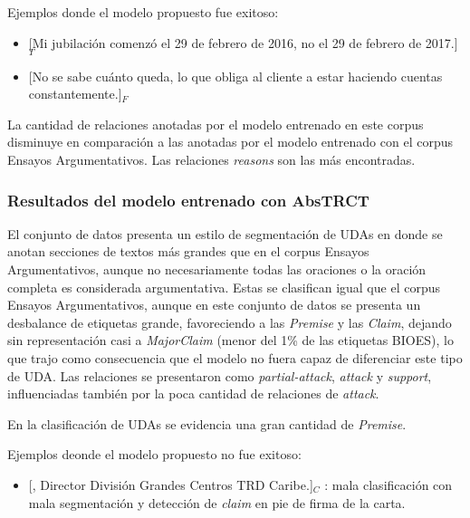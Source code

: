 \documentclass{rcci} %
\begin{document}
Ejemplos donde el modelo propuesto fue exitoso:
\begin{itemize}
	\item \text{} [Mi jubilaci\'on comenz\'o el 29 de febrero de 2016, no el 29 de febrero de 2017.]$_T$ %
	\item \text{} [No se sabe cu\'anto queda, lo que obliga al cliente a estar haciendo cuentas constantemente.]$_F$ %
\end{itemize}

La cantidad de relaciones anotadas por el modelo entrenado en este corpus
disminuye en comparaci\'on a las anotadas por el modelo entrenado con el corpus Ensayos
Argumentativos. Las relaciones \textit{reasons} son las m\'as encontradas. %

\subsubsection*{Resultados del modelo entrenado con AbsTRCT}

El conjunto de datos presenta un estilo de segmentaci\'on de UDAs en donde se anotan 
secciones de textos m\'as grandes que en el corpus Ensayos Argumentativos, aunque no necesariamente 
todas las oraciones o la oraci\'on completa es considerada argumentativa. 
Estas se clasifican igual que el corpus Ensayos Argumentativos, aunque 
en este conjunto de datos se presenta un desbalance de etiquetas grande, favoreciendo 
a las \textit{Premise} y las \textit{Claim},
dejando sin representaci\'on casi a \textit{MajorClaim}
(menor del 1\% de las etiquetas BIOES), lo que trajo como consecuencia que el modelo no fuera 
capaz de diferenciar este tipo de UDA. Las relaciones se presentaron como \textit{partial-attack},
\textit{attack} y \textit{support}, influenciadas tambi\'en por la poca cantidad de relaciones de \textit{attack}.

En la clasificaci\'on de UDAs se evidencia una gran cantidad de \textit{Premise}.

Ejemplos deonde el modelo propuesto no fue exitoso:
\begin{itemize}
	\item \text{} [, Director Divisi\'on Grandes Centros TRD Caribe.]$_C$
	      : mala clasificaci\'on con mala segmentaci\'on y detecci\'on de \textit{claim} en pie de firma de la carta. 
\end{itemize}
\end{document}
